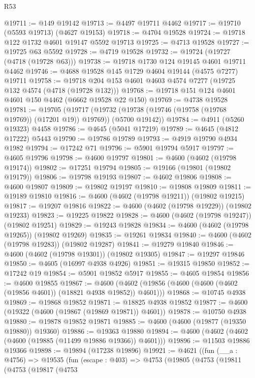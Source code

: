 \begin{lexlean}{R53}
\begin{coremodule}
@19711 := @149 @19142
@19713 := @4497 @19711 @4462
@19717 := @19710 (@5593 @19713) (@4627 @19153)
@19718 := @4704 @19528
@19724 := @19718 @122 @1732 @4601 @19147 @5592 @19713
@19725 := @4713 @19528
@19727 := @19725 @63 @5592
@19728 := @4719 @19528
@19732 := @19724 (@19727 (@4718 (@19728 @63)))
@19738 := @19718 @1730 @124 @19145 @4601 @19711 @4462
@19746 := @4688 @19528 @145 @1729 @4604 @19144 (@4575 @7277) @19711
@19758 := @19718 @204 @153 @4601 @4603 @4574 @7277 (@19725 @132 @4574 (@4718 (@19728 @132)))
@19768 := @19718 @151 @124 @4601 @4601 @150 @4462 (@6662 @19528 @22 @150)
@19769 := @4738 @19528
@19781 := @19705
    (@19717 (@19732 (@19738 (@19746 (@19758 (@19768 @19769)) (@17201 @19)) @19769)) (@5700 @19142))
@19784 := @4911 (@5260 @19323) @4458
@19786 := @4645 (@5041 @17219)
@19789 := @4645 (@4812 @17222) @5443
@19790 := @19786 @19789
@19793 := @4919 @19790 @4934 @1982
@19794 := @17242 @71
@19796 := @5901 @19794 @5917
@19797 := @4605 @19796
@19798 := @4600 @19797
@19801 := @4600 (@4602 (@19798 @19174))
@19802 := @17251 @19794
@19805 := @19166 (@19801 (@19802 @19179))
@19806 := @19798 @19193
@19807 := @4602 @19806
@19808 := @4600 @19807
@19809 := @19802 @19197
@19810 := @19808 @19809
@19811 := @19189 @19810
@19816 := @4600 (@4602 (@19798 @19211)) (@19802 @19215)
@19817 := @19207 @19816
@19822 := @4600 (@4602 (@19798 @19229)) (@19802 @19233)
@19823 := @19225 @19822
@19828 := @4600 (@4602 (@19798 @19247)) (@19802 @19251)
@19829 := @19243 @19828
@19834 := @4600 (@4602 (@19798 @19265)) (@19802 @19269)
@19835 := @19261 @19834
@19840 := @4600 (@4602 (@19798 @19283)) (@19802 @19287)
@19841 := @19279 @19840
@19846 := @4600 (@4602 (@19798 @19301)) (@19802 @19305)
@19847 := @19297 @19846
@19850 := @4605 (@16997 @4938 @4926)
@19851 := @19315 @19850
@19852 := @17242 @19
@19854 := @5901 @19852 @5917
@19855 := @4605 @19854
@19856 := @4600 @19855
@19867 := @4600 (@4602 (@19856 (@4600 (@4600 (@4602 (@19856 @4601)) (@18821 @4938 @19852)) @4601)))
@19868 := @10745 @4938
@19869 := @19868 @19852
@19871 := @18825 @4938 @19852
@19877 := @4600 (@19322 (@4600 (@19867 (@19869 @19871)) @4601))
@19878 := @10750 @4938
@19880 := @19878 @19852 @19871
@19885 := @4600 (@4600 (@19877 (@19350 @19880)) @19360)
@19886 := @19363 @19880
@19894 := @4600 (@4602 (@4602 (@4600 (@19885 (@11499 @19886 @19366)) @4601)))
@19896 := @11503 @19886 @19366
@19898 := @19894 (@17238 @19896)
@19921 := @4621
    ((fun (__a : @4756) =>
    @19535
      (fun (escape : @403) =>
      @4753
        (@19805
          (@4753
            (@19811
              (@4753
                (@19817
                  (@4753

\end{coremodule}
\end{lexlean}
